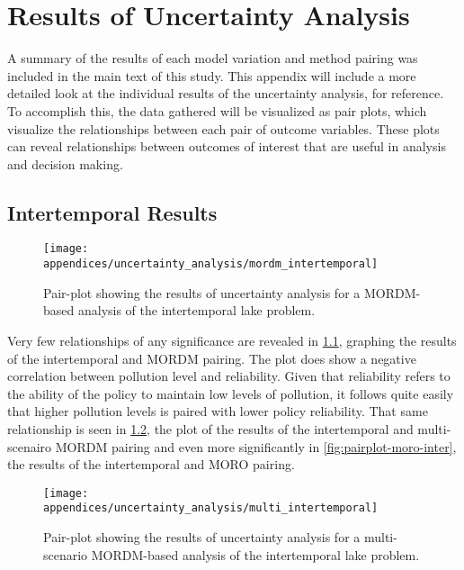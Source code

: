 \chapter{Results of Uncertainty Analysis}
\label{appendix-uncertainty}

A summary of the results of each model variation and method pairing was included in the main text of this study. This appendix will include a more detailed look at the individual results of the uncertainty analysis, for reference. To accomplish this, the data gathered will be visualized as pair plots, which visualize the relationships between each pair of outcome variables. These plots can reveal relationships between outcomes of interest that are useful in analysis and decision making. 

\section{Intertemporal Results}

\begin{figure}[h]
    \centering
    
    \texttt{[image: appendices/uncertainty\_analysis/mordm\_intertemporal]}
    \caption[Intertemporal + MORDM pair plot]{Pair-plot showing the results of uncertainty analysis for a MORDM-based analysis of the intertemporal lake problem.}
    \label{fig:pairplot-mordm-inter}
\end{figure}

Very few relationships of any significance are revealed in \cref{fig:pairplot-mordm-inter}, graphing the results of the intertemporal and MORDM pairing. The plot does show a negative correlation between pollution level and reliability. Given that reliability refers to the ability of the policy to maintain low levels of pollution, it follows quite easily that higher pollution levels is paired with lower policy reliability. That same relationship is seen in \cref{fig:pairplot-multi-inter}, the plot of the results of the intertemporal and multi-scenairo MORDM pairing and even more significantly in \cref{fig:pairplot-moro-inter}, the results of the intertemporal and MORO pairing. 

\begin{figure}[h!]
    \centering
    
    \texttt{[image: appendices/uncertainty\_analysis/multi\_intertemporal]}
    \caption[Intertemporal + multi-scenario MORDM pair plot]{Pair-plot showing the results of uncertainty analysis for a multi-scenario MORDM-based analysis of the intertemporal lake problem.}
    \label{fig:pairplot-multi-inter}
\end{figure}

